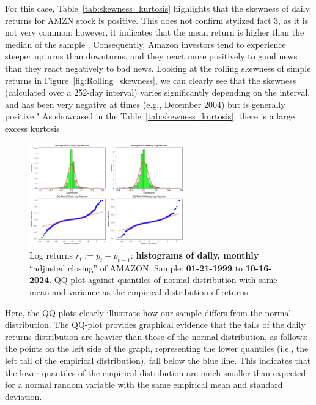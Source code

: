 \documentclass{article}
\begin{document}
\noindent For this case, Table~\ref{tab:skewness_kurtosis} highlights that the skewness of daily returns for AMZN stock is positive.
This does not confirm stylized fact 3, as it is not very common; however, it indicates that the mean return is higher than the median of the sample \cite{albuquerque2012skewness}. 
Consequently, Amazon investors tend to experience steeper upturns than downturns, and they react more positively to good news than they react negatively to bad news.
Looking at the rolling skewness of simple returns in Figure~\ref{fig:Rolling_skewness}, we can clearly see that the skewness (calculated over a 252-day interval) 
varies significantly depending on the interval, and has been very negative at times (e.g., December 2004) but is generally positive."
\noindent As showcased in the Table~\ref{tab:skewness_kurtosis}, there is a large excess kurtosis

\begin{figure}[H]
    \centering
    \includegraphics[width=0.6\textwidth]{Img/QQplot_daily_weekly_AMZN.pdf}
    \caption{Log returns $r_t := p_t - p_{t-1}$: \textbf{histograms of daily, monthly} “adjusted closing” of AMAZON. 
    Sample: \textbf{01-21-1999} to \textbf{10-16-2024}. QQ plot against quantiles of normal distribution with same mean and variance as the empirical distribution of returns.}
    \label{fig:Hstogram_QQ_plot}
\end{figure}

\noindent Here, the QQ-plots clearly illustrate how our sample differs from the normal distribution. 
The QQ-plot provides graphical evidence that the tails of the daily returns distribution are heavier than those of the normal distribution, as follows: 
the points on the left side of the graph, representing the lower quantiles (i.e., the left tail of the empirical distribution), 
fall below the blue line. This indicates that the lower quantiles of the empirical distribution are much smaller than expected for a normal random variable with the same empirical mean and standard deviation. 
\end{document}
